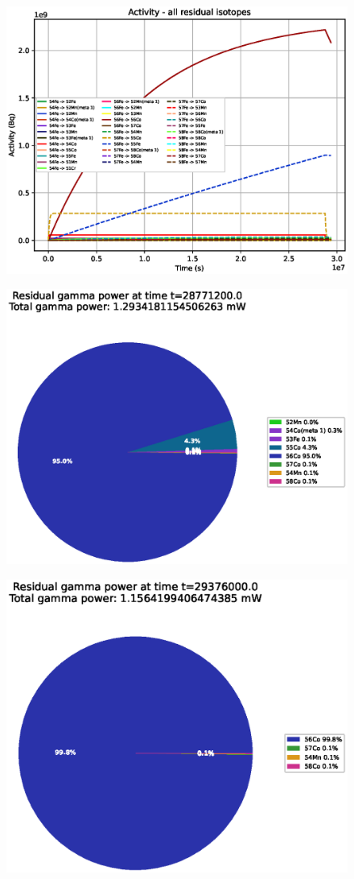 \begin{figure}[!htb]
\centering
\includegraphics[width=0.7\linewidth]{chapters/activity_code/fe_100dpa/by_isotope/20MeV_all_radioactive_isotopes.eps}
\caption{}
\label{fig:5mev-proton-100dpa-activity}
\end{figure}

\begin{figure}[!htb]
\centering
\includegraphics[width=0.7\linewidth]{chapters/activity_code/fe_100dpa/endofbeam/20MeV_0400_28771200.eps}
\caption{}
\label{fig:5mev-proton-100dpa}
\end{figure}

\begin{figure}[!htb]
\centering
\includegraphics[width=0.7\linewidth]{chapters/activity_code/fe_100dpa/endofbeam/20MeV_0500_29376000.eps}
\caption{}
\label{fig:5mev-proton-100dpa}
\end{figure}



